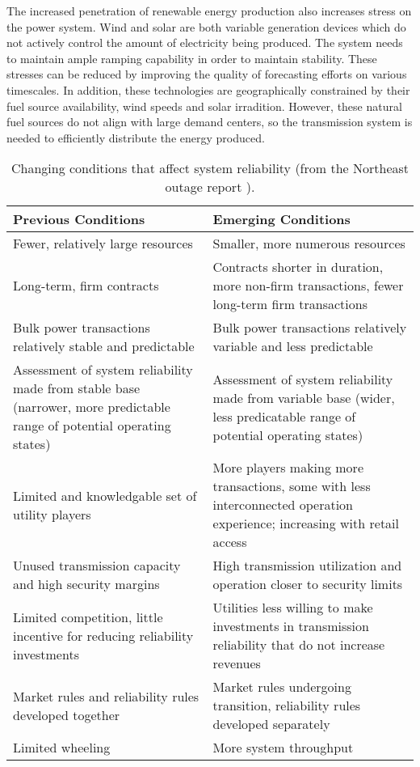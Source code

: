 The increased penetration of renewable energy production also increases stress on the power system.  Wind and solar are both variable generation devices which do not actively control the amount of electricity being produced.  The system needs to maintain ample ramping capability in order to maintain stability.  These stresses can be reduced by improving the quality of forecasting efforts on various timescales.  In addition, these technologies are geographically constrained by their fuel source availability, wind speeds and solar irradition.  However, these natural fuel sources do not align with large demand centers, so the transmission system is needed to efficiently distribute the energy produced.

\begin{table}
\centering
\footnotesize
\begin{tabular}{| p{7cm} | p{7cm} |}
\hline
\bf Previous Conditions 	&	\bf Emerging Conditions 		\\	\hline  	\hline
Fewer, relatively large resources	&	Smaller, more numerous resources		\\	\hline
Long-term, firm contracts 	&	Contracts shorter in duration, more non-firm transactions, fewer long-term firm transactions	\\	\hline
Bulk power transactions relatively stable and predictable	&	Bulk power transactions relatively variable and less predictable	\\	\hline
Assessment of system reliability made from stable base (narrower, more predictable range of potential operating states)	&	Assessment of system reliability made from variable base (wider, less predicatable range of potential operating states)		\\		\hline
Limited and knowledgable set of utility players 	&	More players making more transactions, some with less interconnected operation experience; increasing with retail access	\\	\hline
Unused transmission capacity and high security margins	&	High transmission utilization and operation closer to security limits	\\	\hline
Limited competition, little incentive for reducing reliability investments	&	Utilities less willing to make investments in transmission reliability that do not increase revenues	\\	\hline
Market rules and reliability rules developed together	&	Market rules undergoing transition, reliability rules developed separately	\\	\hline
Limited wheeling	&	More system throughput	\\	\hline
\end{tabular}
\caption{\small Changing conditions that affect system reliability (from the Northeast outage report \cite{northeast_2003}).}
 \label{tab:change1}
\end{table}

